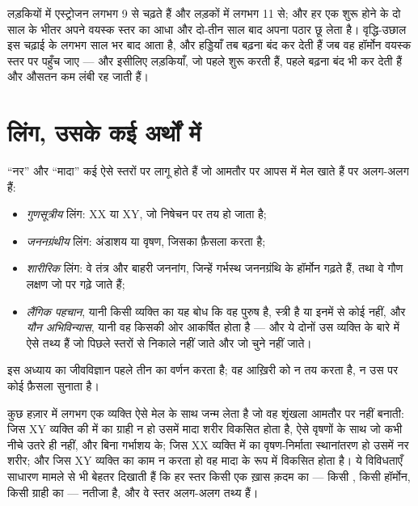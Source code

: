 \begin{example}[वक्र पढ़ना]\label{ex:g11:becoming-male-female:curves}
लड़कियों में एस्ट्रोजन लगभग 9 से चढ़ते हैं और लड़कों में 
लगभग 11 से; और हर एक शुरू होने के दो साल के भीतर अपने वयस्क स्तर का आधा और
दो-तीन साल बाद अपना पठार छू लेता है। वृद्धि-उछाल इस चढ़ाई के लगभग साल भर
बाद आता है, और हड्डियाँ तब बढ़ना बंद कर देती हैं जब वह हॉर्मोन वयस्क स्तर
पर पहुँच जाए --- और इसीलिए लड़कियाँ, जो पहले शुरू करती हैं, पहले बढ़ना बंद
भी कर देती हैं और औसतन कम लंबी रह जाती हैं।
\end{example}

\section{लिंग, उसके कई अर्थों में}

\begin{proposition}\label{prop:g11:becoming-male-female:levels}
``नर'' और ``मादा'' कई ऐसे स्तरों पर लागू होते हैं जो आमतौर पर आपस में मेल
खाते हैं पर अलग-अलग हैं:
\begin{itemize}
  \item \emph{गुणसूत्रीय} लिंग: XX या XY, जो निषेचन पर तय हो जाता है;
  \item \emph{जननग्रंथीय} लिंग: अंडाशय या वृषण, जिसका फ़ैसला  करता है;
  \item \emph{शारीरिक} लिंग: वे तंत्र और बाहरी जननांग, जिन्हें गर्भस्थ
        जननग्रंथि के हॉर्मोन गढ़ते हैं, तथा वे गौण लक्षण जो  पर
        गढ़े जाते हैं;
  \item \emph{लैंगिक पहचान}, यानी किसी व्यक्ति का यह बोध कि वह पुरुष है,
        स्त्री है या इनमें से कोई नहीं, और \emph{यौन अभिविन्यास}, यानी वह
        किसकी ओर आकर्षित होता है --- और ये दोनों उस व्यक्ति के बारे में
        ऐसे तथ्य हैं जो पिछले स्तरों से निकाले नहीं जाते और जो चुने नहीं
        जाते।
\end{itemize}
इस अध्याय का जीवविज्ञान पहले तीन का वर्णन करता है; वह आख़िरी को न तय करता
है, न उस पर कोई फ़ैसला सुनाता है।
\end{proposition}
\admitted

\begin{example}[जब स्तर आपस में मेल न खाएँ]\label{ex:g11:becoming-male-female:disagree}
कुछ हज़ार में लगभग एक व्यक्ति ऐसे मेल के साथ जन्म लेता है जो वह शृंखला
आमतौर पर नहीं बनाती: जिस XY व्यक्ति की  में  का ग्राही
न हो उसमें मादा शरीर विकसित होता है, ऐसे वृषणों के साथ जो कभी नीचे उतरे ही
नहीं, और बिना गर्भाशय के; जिस XX व्यक्ति में  का वृषण-निर्माता
स्थानांतरण हो उसमें नर शरीर; और जिस XY व्यक्ति का  काम न करता हो वह मादा
के रूप में विकसित होता है। ये विविधताएँ साधारण मामले से भी बेहतर दिखाती हैं
कि हर स्तर किसी एक ख़ास क़दम का --- किसी , किसी हॉर्मोन, किसी ग्राही का
--- नतीजा है, और वे स्तर अलग-अलग तथ्य हैं।
\end{example}

